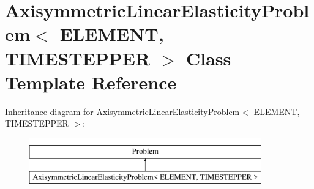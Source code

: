 \hypertarget{classAxisymmetricLinearElasticityProblem}{}\section{Axisymmetric\+Linear\+Elasticity\+Problem$<$ E\+L\+E\+M\+E\+NT, T\+I\+M\+E\+S\+T\+E\+P\+P\+ER $>$ Class Template Reference}
\label{classAxisymmetricLinearElasticityProblem}
Inheritance diagram for Axisymmetric\+Linear\+Elasticity\+Problem$<$ E\+L\+E\+M\+E\+NT, T\+I\+M\+E\+S\+T\+E\+P\+P\+ER $>$\+:\begin{figure}[H]
\begin{center}
\leavevmode
\includegraphics[height=2.000000cm]{classAxisymmetricLinearElasticityProblem}
\end{center}
\end{figure}
